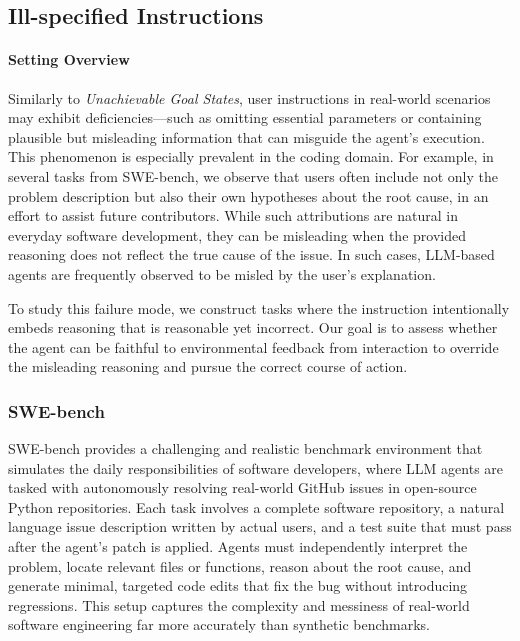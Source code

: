 

\subsection{Ill-specified Instructions}
\paragraph{Setting Overview}
Similarly to \textit{Unachievable Goal States}, user instructions in real-world scenarios may exhibit deficiencies---such as omitting essential parameters or containing plausible but misleading information that can misguide the agent's execution. This phenomenon is especially prevalent in the coding domain. For example, in several tasks from SWE-bench, we observe that users often include not only the problem description but also their own hypotheses about the root cause, in an effort to assist future contributors. While such attributions are natural in everyday software development, they can be misleading when the provided reasoning does not reflect the true cause of the issue. In such cases, LLM-based agents are frequently observed to be misled by the user's explanation.

To study this failure mode, we construct tasks where the instruction intentionally embeds reasoning that is reasonable yet incorrect. Our goal is to assess whether the agent can be faithful to environmental feedback from interaction to override the misleading reasoning and pursue the correct course of action.

\subsubsection{SWE-bench}

SWE-bench provides a challenging and realistic benchmark environment that simulates the daily responsibilities of software developers, where LLM agents are tasked with autonomously resolving real-world GitHub issues in open-source Python repositories. Each task involves a complete software repository, a natural language issue description written by actual users, and a test suite that must pass after the agent's patch is applied. Agents must independently interpret the problem, locate relevant files or functions, reason about the root cause, and generate minimal, targeted code edits that fix the bug without introducing regressions. This setup captures the complexity and messiness of real-world software engineering far more accurately than synthetic benchmarks.

